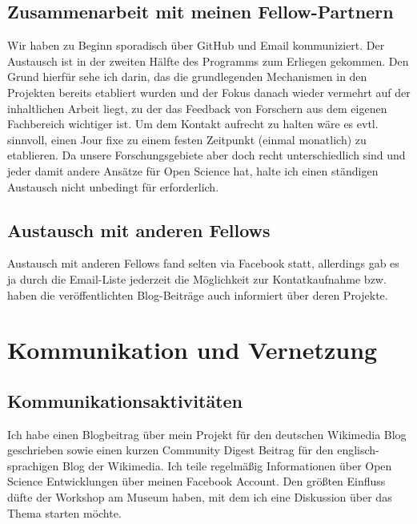\documentclass[11pt,a4paper]{article}
\begin{document}
\subsection{Zusammenarbeit mit meinen Fellow-Partnern}%
Wir haben zu Beginn sporadisch über GitHub und Email kommuniziert.
Der Austausch ist in der zweiten Hälfte des Programms zum Erliegen gekommen. Den Grund hierfür sehe ich darin, das die grundlegenden Mechanismen in den Projekten bereits etabliert wurden und der Fokus danach wieder vermehrt auf der inhaltlichen Arbeit liegt, zu der das Feedback von Forschern aus dem eigenen Fachbereich wichtiger ist. Um dem Kontakt aufrecht zu halten wäre es evtl. sinnvoll, einen Jour fixe zu einem festen Zeitpunkt (einmal monatlich) zu etablieren. Da unsere Forschungsgebiete aber doch recht unterschiedlich sind und jeder damit andere Ansätze für Open Science hat, halte ich einen ständigen Austausch nicht unbedingt für erforderlich.


\subsection{Austausch mit anderen Fellows}%
Austausch mit anderen Fellows fand selten via Facebook statt, allerdings gab es ja durch die Email-Liste jederzeit die Möglichkeit zur Kontatkaufnahme bzw. haben die veröffentlichten Blog-Beiträge auch informiert über deren Projekte.



\section{Kommunikation und Vernetzung}%
\subsection{Kommunikationsaktivitäten}%
Ich habe einen Blogbeitrag über mein Projekt für den deutschen Wikimedia Blog geschrieben sowie einen kurzen Community Digest Beitrag für den englisch-sprachigen Blog der Wikimedia. Ich  teile regelmäßig Informationen über Open Science Entwicklungen über meinen Facebook Account. Den größten Einfluss düfte der Workshop am Museum haben, mit dem ich eine Diskussion über das Thema starten möchte. 
\end{document}
